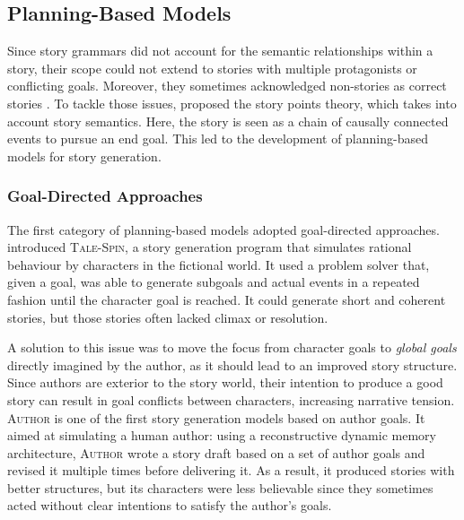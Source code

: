 \subsection{Planning-Based Models}
\label{sub:planning_based_models}

Since story grammars did not account for the semantic relationships within a story, their scope could not extend to stories with multiple protagonists or conflicting goals. Moreover, they sometimes acknowledged non-stories as correct stories \citep{black1980story}. To tackle those issues, \citet{wilensky1983story} proposed the story points theory, which takes into account story semantics. Here, the story is seen as a chain of causally connected events to pursue an end goal. This led to the development of planning-based models for story generation.

\subsubsection{Goal-Directed Approaches}

The first category of planning-based models adopted goal-directed approaches. \citet{meehan1977tale} introduced \textsc{Tale-Spin}, a story generation program that simulates rational behaviour by characters in the fictional world. It used a problem solver that, given a goal, was able to generate subgoals and actual events in a repeated fashion until the character goal is reached. It could generate short and coherent stories, but those stories often lacked climax or resolution.

A solution to this issue was to move the focus from character goals to \emph{global goals} directly imagined by the author, as it should lead to an improved story structure. Since authors are exterior to the story world, their intention to produce a good story can result in goal conflicts between characters, increasing narrative tension. \textsc{Author} \citep{dehn1981story} is one of the first story generation models based on author goals. It aimed at simulating a human author: using a reconstructive dynamic memory architecture, \textsc{Author} wrote a story draft based on a set of author goals and revised it multiple times before delivering it. As a result, it produced stories with better structures, but its characters were less believable since they sometimes acted without clear intentions to satisfy the author's goals.

